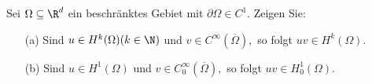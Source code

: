 
\begin{exercise}

  Sei $\Omega \subseteq \R^d$ ein beschränktes Gebiet mit $\partial\Omega \in C^1.$ Zeigen Sie:
  \begin{itemize}
      \item[(a)] Sind $u \in H^k(\Omega) (k \in \N)$ und $v \in C^\infty(\overline{\Omega}),$ so folgt $uv \in H^k(\Omega).$
       \item[(b)] Sind $u \in H^1(\Omega)$ und $v \in C_0^\infty(\overline{\Omega}),$ so folgt $uv \in H^1_0(\Omega).$
  \end{itemize}

\end{exercise}


